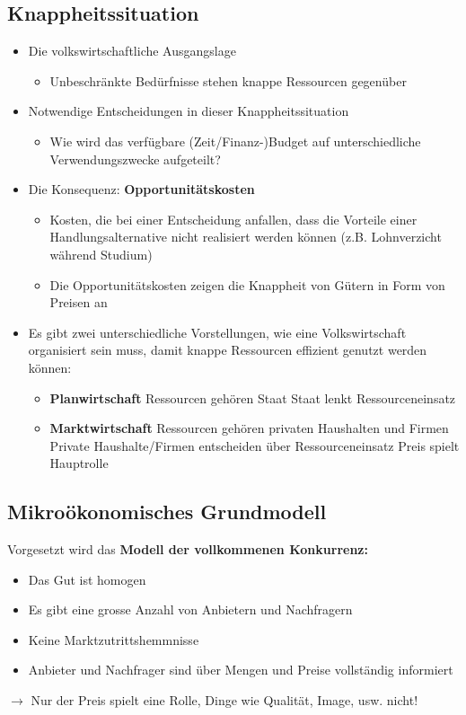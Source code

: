 \subsection{Knappheitssituation}
\begin{itemize}
	\item[\-] Die volkswirtschaftliche Ausgangslage
	\begin{itemize}
		\item Unbeschränkte Bedürfnisse stehen knappe Ressourcen gegenüber
	\end{itemize}
	\item[\-] Notwendige Entscheidungen in dieser Knappheitssituation
	\begin{itemize}
		\item Wie wird das verfügbare (Zeit/Finanz-)Budget auf unterschiedliche Verwendungszwecke aufgeteilt?
	\end{itemize}
	\item[\-] Die Konsequenz: \textbf{Opportunitätskosten}
	\begin{itemize}
		\item Kosten, die bei einer Entscheidung anfallen, dass die Vorteile einer Handlungsalternative nicht realisiert werden können (z.B. Lohnverzicht während Studium)
		\item Die Opportunitätskosten zeigen die Knappheit von Gütern in Form von Preisen an
	\end{itemize}
	\item[\-] Es gibt zwei unterschiedliche Vorstellungen, wie eine Volkswirtschaft organisiert sein muss, damit knappe Ressourcen effizient genutzt werden können:
	\begin{itemize}
		\item \textbf{Planwirtschaft}
		\subitem Ressourcen gehören Staat
		\subitem Staat lenkt Ressourceneinsatz
		\item \textbf{Marktwirtschaft}
		\subitem Ressourcen gehören privaten Haushalten und Firmen 
		\subitem Private Haushalte/Firmen entscheiden über Ressourceneinsatz
		\subitem Preis spielt Hauptrolle
	\end{itemize}
\end{itemize}

\subsection{Mikroökonomisches Grundmodell}
Vorgesetzt wird das \textbf{Modell der vollkommenen Konkurrenz:}
\begin{itemize}
	\item Das Gut ist homogen
	\item Es gibt eine grosse Anzahl von Anbietern und Nachfragern
	\item Keine Marktzutrittshemmnisse
	\item Anbieter und Nachfrager sind über Mengen und Preise vollständig informiert
\end{itemize}
$\rightarrow$ Nur der Preis spielt eine Rolle, Dinge wie Qualität, Image, usw. nicht!\\

